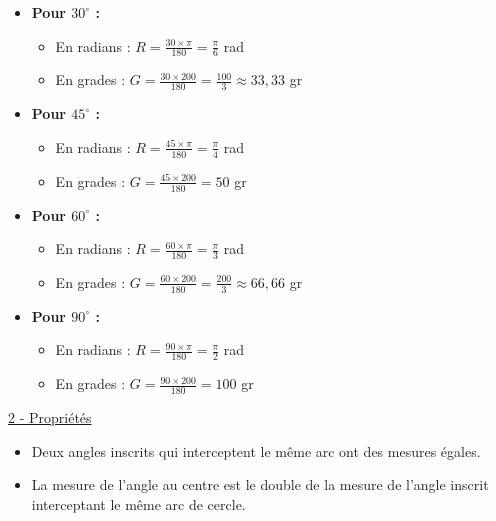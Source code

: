 \documentclass[12pt,a4paper]{article}
\begin{document}
\begin{itemize}
    \item[a)] \textbf{Pour $30^{\circ}$ :}
    \begin{itemize}
        \item En radians : $R = \frac{30 \times \pi}{180} = \frac{\pi}{6}$ rad
        \item En grades : $G = \frac{30 \times 200}{180} = \frac{100}{3} \approx 33,33$ gr
    \end{itemize}

    \item[b)] \textbf{Pour $45^{\circ}$ :}
    \begin{itemize}
        \item En radians : $R = \frac{45 \times \pi}{180} = \frac{\pi}{4}$ rad
        \item En grades : $G = \frac{45 \times 200}{180} = 50$ gr
    \end{itemize}

    \item[c)] \textbf{Pour $60^{\circ}$ :}
    \begin{itemize}
        \item En radians : $R = \frac{60 \times \pi}{180} = \frac{\pi}{3}$ rad
        \item En grades : $G = \frac{60 \times 200}{180} = \frac{200}{3} \approx 66,66$ gr
    \end{itemize}

    \item[d)] \textbf{Pour $90^{\circ}$ :}
    \begin{itemize}
        \item En radians : $R = \frac{90 \times \pi}{180} = \frac{\pi}{2}$ rad
        \item En grades : $G = \frac{90 \times 200}{180} = 100$ gr
    \end{itemize}
\end{itemize}

\begin{center}
    \textcolor{monRouge}{\underline{\Large 2 - Propriétés}}
\end{center}

\begin{itemize}
    \item[i)] Deux angles inscrits qui interceptent le même arc ont des \textcolor{monRouge}{mesures égales}.
    
    \item[ii)] La mesure de l'angle au centre est le \textcolor{monRouge}{double} de la mesure de l'angle inscrit interceptant le même arc de cercle.
\end{itemize}
\end{document}
